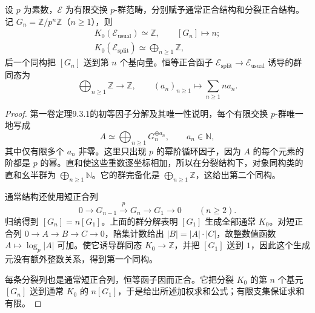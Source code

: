 \begin{proposition}\label{b4:prop:B-p-group-kzero}
	设 \(p\) 为素数，\(\mathcal E\) 为有限交换 \(p\)-群范畴，分别赋予通常正合结构和分裂正合结构。记 \(G_n=\mathbb Z/p^n\mathbb Z\)（\(n\ge1\)），则
	\[
		\begin{gathered}
			K_0(\mathcal E_{\mathrm{usual}})\simeq\mathbb Z, \qquad [G_n]\longmapsto n;\\
			K_0(\mathcal E_{\mathrm{split}})\simeq \bigoplus_{n\ge1}\mathbb Z,
		\end{gathered}
	\]
	后一个同构把 \([G_n]\) 送到第 \(n\) 个基向量。恒等正合函子 \(\mathcal E_{\mathrm{split}}\to\mathcal E_{\mathrm{usual}}\) 诱导的群同态为
	\[
		\bigoplus_{n\ge1}\mathbb Z\longrightarrow\mathbb Z, \qquad (a_n)_{n\ge1}\longmapsto\sum_{n\ge1}n a_n.
	\]
\end{proposition}
\begin{proof}
	第一卷定理9.3.1的初等因子分解及其唯一性说明，每个有限交换 \(p\)-群唯一地写成
	\[
		A\simeq\bigoplus_{n\ge1}G_n^{\oplus a_n}, \qquad a_n\in\mathbb N,
	\]
	其中仅有限多个 \(a_n\) 非零。这里只出现 \(p\) 的幂阶循环因子，因为 \(A\) 的每个元素的阶都是 \(p\) 的幂。直和使这些重数逐坐标相加，所以在分裂结构下，对象同构类的直和幺半群为 \(\bigoplus_{n\ge1}\mathbb N\)。它的群完备化是 \(\bigoplus_{n\ge1}\mathbb Z\)，这给出第二个同构。

	通常结构还使用短正合列
	\[
		0\longrightarrow G_{n-1}\xrightarrow{\,p\,}G_n \longrightarrow G_1\longrightarrow0 \qquad(n\ge2).
	\]
	归纳得到 \([G_n]=n[G_1]\)。上面的群分解表明 \([G_1]\) 生成全部通常 \(K_0\)。对短正合列 \(0\to A\to B\to C\to0\)，陪集计数给出 \(|B|=|A|\cdot|C|\)，故整数值函数 \(A\mapsto\log_p|A|\) 可加。使它诱导群同态 \(K_0\to\mathbb Z\)，并把 \([G_1]\) 送到 \(1\)，因此这个生成元没有额外整数关系，得到第一个同构。

	每条分裂列也是通常短正合列，恒等函子因而正合。它把分裂 \(K_0\) 的第 \(n\) 个基元 \([G_n]\) 送到通常 \(K_0\) 的 \(n[G_1]\)，于是给出所述加权求和公式；有限支集保证求和有限。
\end{proof}
